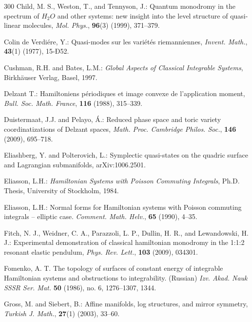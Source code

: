 \documentclass[11pt]{article}
\begin{document}
{\begin{thebibliography}{300}
   Child, M. S., Weston, T., and Tennyson, J.: Quantum
    monodromy in the spectrum of $H_2O$ and other systems: new insight
    into the level structure of quasi-linear molecules,
    \textit{Mol. Phys.}, \textbf{96}(3) (1999), 371--379.

   Colin de Verdi\'ere, Y.: Quasi-modes sur les
    vari\'et\'es riemanniennes, \textit{Invent. Math.}, {\bf 43}(1)
    (1977), 15-Ð52.

   Cushman, R.H. and Bates, L.M.: \textit{Global
      Aspects of Classical Integrable Systems}, Birkh\"auser Verlag,
    Basel, 1997.

   Delzant T.: Hamiltoniens p\'eriodiques et
    image convexe de l'application moment,
    \textit{Bull. Soc. Math. France}, {\bf 116} (1988), 315--339.

   Duistermaat, J.J. and Pelayo, {\'A}.: Reduced
    phase space and toric variety coordinatizations of Delzant spaces,
    \textit{Math. Proc. Cambridge Philos. Soc.}, \textbf{146} (2009),
    695--718.

   Eliashberg, Y. and Polterovich, L.: Symplectic
    quasi-states on the quadric surface and Lagrangian submanifolds,
    arXiv:1006.2501.

   Eliasson, L.H.: \textit{Hamiltonian Systems
      with Poisson Commuting Integrals}, Ph.D. Thesis, University of
    Stockholm, 1984.
 
   Eliasson, L.H.: Normal forms for Hamiltonian
    systems with Poisson commuting integrals -- elliptic case.
    \textit{Comment. Math. Helv.}, \textbf{65} (1990), 4--35.

   Fitch, N. J., Weidner, C. A., Parazzoli, L. P.,
    Dullin, H. R., and Lewandowski, H. J.: Experimental demonstration
    of classical hamiltonian monodromy in the 1:1:2 resonant elastic
    pendulum, \textit{Phys. Rev. Lett.}, \textbf{103} (2009), 034301.

   Fomenko, A. T.  The topology of surfaces of
    constant energy of integrable Hamiltonian systems and obstructions
    to integrability. (Russian) \textit{Izv. Akad. Nauk SSSR
      Ser. Mat.} \textbf{50} (1986), no. 6, 1276–1307, 1344.

   Gross, M. and Siebert, B.: Affine manifolds, log
    structures, and mirror symmetry, \textit{Turkish J. Math.},
    \textbf{27}(1) (2003), 33--60.


\end{thebibliography}}
\end{document}
